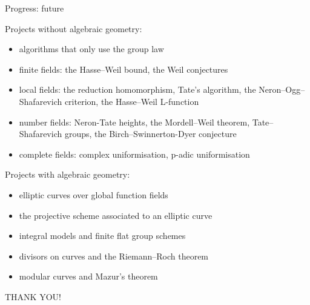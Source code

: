 \documentclass[10pt]{beamer}
\begin{document}
\begin{frame}[t]{Progress: future}

Projects without algebraic geometry:
\begin{itemize}
\item algorithms that only use the group law
\item finite fields: the Hasse--Weil bound, the Weil conjectures
\item local fields: the reduction homomorphism, Tate's algorithm, the Neron--Ogg--Shafarevich criterion, the Hasse--Weil L-function
\item number fields: Neron-Tate heights, the Mordell--Weil theorem, Tate--Shafarevich groups, the Birch--Swinnerton-Dyer conjecture
\item complete fields: complex uniformisation, p-adic uniformisation
\end{itemize}

\pause

Projects with algebraic geometry:
\begin{itemize}
\item elliptic curves over global function fields
\item the projective scheme associated to an elliptic curve
\item integral models and finite flat group schemes
\item divisors on curves and the Riemann--Roch theorem
\item modular curves and Mazur's theorem
\end{itemize}

\end{frame}

\begin{frame}

\begin{center}
\Huge THANK YOU!
\end{center}

\end{frame}
\end{document}
